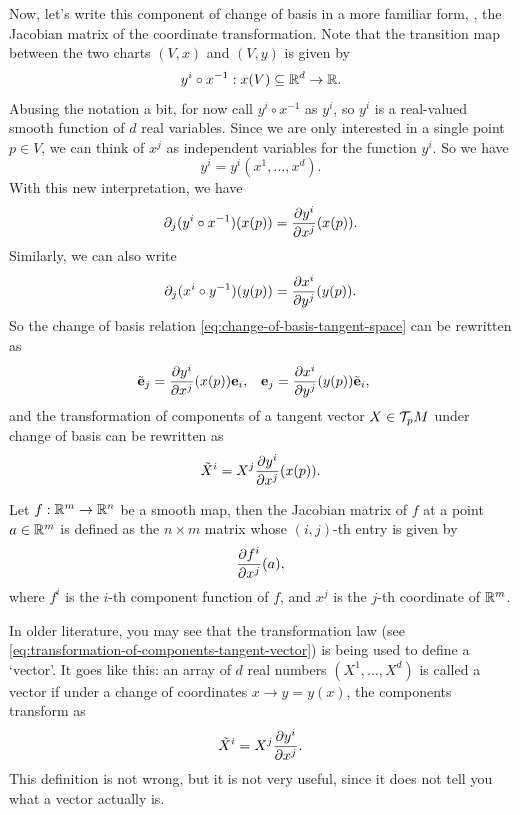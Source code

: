 Now, let's write this component of change of basis in a more familiar form, \ie, the Jacobian matrix of the coordinate transformation. Note that the transition map between the two charts \((V, x)\) and \((V, y)\) is given by
\begin{equation}
	y^i \circ x^{-1}: x(V) \subseteq \mathbb R^d \to \mathbb R.
\end{equation}
Abusing the notation a bit, for now call \(y^i \circ x^{-1}\) as \(y^i\), so \(y^i\) is a real-valued smooth function of \(d\) real variables. Since we are only interested in a single point \(p \in V\), we can think of \(x^j\) as independent variables for the function \(y^i\). So we have
\begin{equation}
	y^i = y^i(x^1, \ldots, x^d).
\end{equation}
With this new interpretation, we have
\begin{equation}
	\partial_j (y^i \circ x^{-1})(x(p)) = \pdv{y^i}{x^j} \qty(x(p)).
\end{equation}
Similarly, we can also write
\begin{equation}
	\partial_j (x^i \circ y^{-1})(y(p)) = \pdv{x^i}{y^j} \qty(y(p)).
\end{equation}
So the change of basis relation \eqref{eq:change-of-basis-tangent-space} can be rewritten as
\begin{align}
	\tilde{\vb{e}}_j & = \pdv{y^i}{x^j} \qty(x(p)) \vb{e}_i, & \vb{e}_j & = \pdv{x^i}{y^j} \qty(y(p)) \tilde{\vb{e}}_i,
\end{align}
and the transformation of components of a tangent vector \(X \in \mathcal T_p M\) under change of basis can be rewritten as
\begin{equation} \label{eq:transformation-of-components-tangent-vector}
	\tilde{X}^i = X^j \pdv{y^i}{x^j} \qty(x(p)).
\end{equation}
\begin{remark}
	Let \(f: \mathbb R^m \to \mathbb R^n\) be a smooth map, then the Jacobian matrix of \(f\) at a point \(a \in \mathbb R^m\) is defined as the \(n \times m\) matrix whose \((i, j)\)-th entry is given by
	\begin{equation}
		\pdv{f^i}{x^j} \qty(a),
	\end{equation}
	where \(f^i\) is the \(i\)-th component function of \(f\), and \(x^j\) is the \(j\)-th coordinate of \(\mathbb R^m\).
\end{remark}

In older literature, you may see that the transformation law (see \eqref{eq:transformation-of-components-tangent-vector}) is being used to define a `vector'. It goes like this: an array of \(d\) real numbers \((X^1, \ldots, X^d)\) is called a vector if under a change of coordinates \(x \to y = y(x)\), the components transform as
\begin{equation}
	\tilde{X}^i = X^j \pdv{y^i}{x^j}.
\end{equation}
This definition is not wrong, but it is not very useful, since it does not tell you what a vector actually is.

